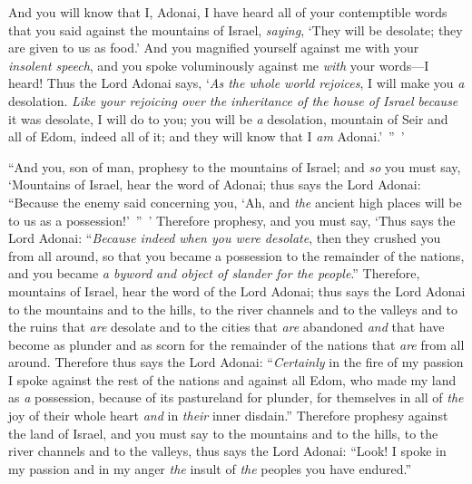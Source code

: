 \begin{biblechapter}
\verse And you will know that I, Adonai, I have heard all of your contemptible words that you said against the mountains of Israel, \textit{saying}, ‘They will be desolate; they are given to us as food.’
\verse And you magnified yourself against me with your \textit{insolent speech}, and you spoke voluminously against me \textit{with} your words—I heard!
\verse Thus the Lord Adonai says, ‘\textit{As the whole world rejoices}, I will make you \textit{a} desolation.
\verse \textit{Like your rejoicing over the inheritance of the house of Israel} \textit{because} it was desolate, I will do to you; you will be \textit{a} desolation, mountain of Seir and all of Edom, indeed all of it; and they will know that I \textit{am} Adonai.’ ” ’
\end{biblechapter}

\begin{biblechapter} %
 “And you, son of man, prophesy to the mountains of Israel; and \textit{so} you must say, ‘Mountains of Israel, hear the word of Adonai;
\verse thus says the Lord Adonai: “Because the enemy said concerning you, ‘Ah, and \textit{the} ancient high places will be to us as a possession!’ ” ’
\verse Therefore prophesy, and you must say, ‘Thus says the Lord Adonai: “\textit{Because indeed} \textit{when you were desolate}, then they crushed you from all around, so that you became a possession to the remainder of the nations, and you became \textit{a byword and object of slander for the people}.”
\verse Therefore, mountains of Israel, hear the word of the Lord Adonai; thus says the Lord Adonai to the mountains and to the hills, to the river channels and to the valleys and to the ruins that \textit{are} desolate and to the cities that \textit{are} abandoned \textit{and} that have become as plunder and as scorn for the remainder of the nations that \textit{are} from all around.
\verse Therefore thus says the Lord Adonai: “\textit{Certainly} in the fire of my passion I spoke against the rest of the nations and against all Edom, who made my land as \textit{a} possession, because of its pastureland for plunder, for themselves in all of \textit{the} joy of their whole heart \textit{and} in \textit{their} inner disdain.”
\verse Therefore prophesy against the land of Israel, and you must say to the mountains and to the hills, to the river channels and to the valleys, thus says the Lord Adonai: “Look! I spoke in my passion and in my anger \textit{the} insult of \textit{the} peoples you have endured.”

\end{biblechapter}
